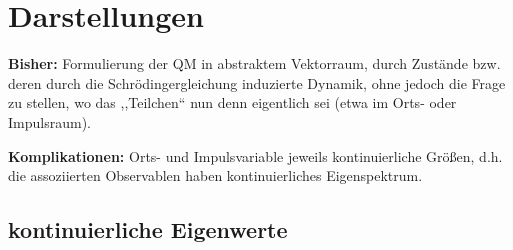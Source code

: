 
\chapter{Darstellungen}

\textbf{Bisher:} Formulierung der QM in abstraktem Vektorraum, durch Zustände bzw. deren durch die Schrödingergleichung induzierte Dynamik, ohne jedoch die Frage zu stellen, wo das ,,Teilchen`` nun denn eigentlich sei (etwa im Orts- oder Impulsraum).\par
\textbf{Komplikationen:} Orts- und Impulsvariable jeweils kontinuierliche Größen, d.h. die assoziierten Observablen haben kontinuierliches Eigenspektrum.

\section{kontinuierliche Eigenwerte}

